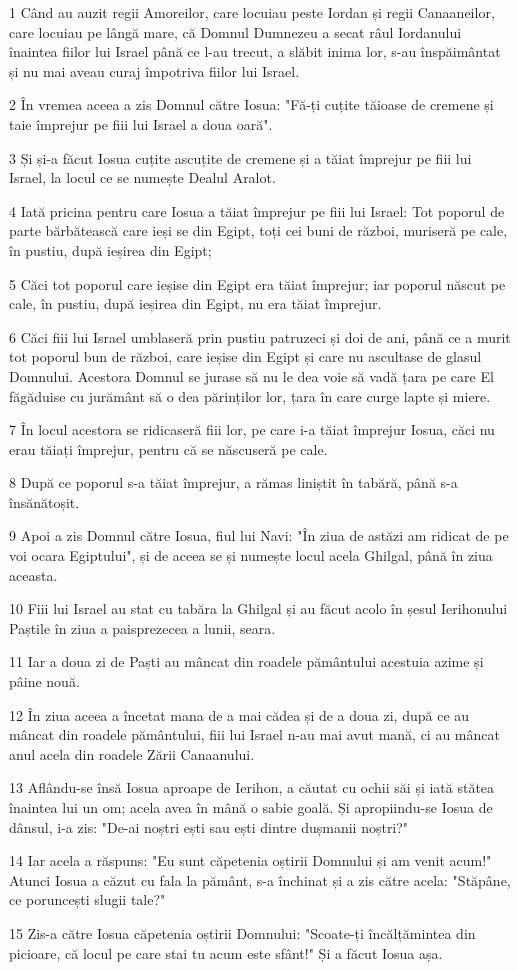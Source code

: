 \par 1 Când au auzit regii Amoreilor, care locuiau peste Iordan și regii Canaaneilor, care locuiau pe lângă mare, că Domnul Dumnezeu a secat râul Iordanului înaintea fiilor lui Israel până ce l-au trecut, a slăbit inima lor, s-au înspăimântat și nu mai aveau curaj împotriva fiilor lui Israel.
\par 2 În vremea aceea a zis Domnul către Iosua: "Fă-ți cuțite tăioase de cremene și taie împrejur pe fiii lui Israel a doua oară".
\par 3 Și și-a făcut Iosua cuțite ascuțite de cremene și a tăiat împrejur pe fiii lui Israel, la locul ce se numește Dealul Aralot.
\par 4 Iată pricina pentru care Iosua a tăiat împrejur pe fiii lui Israel: Tot poporul de parte bărbătească care ieși se din Egipt, toți cei buni de război, muriseră pe cale, în pustiu, după ieșirea din Egipt;
\par 5 Căci tot poporul care ieșise din Egipt era tăiat împrejur; iar poporul născut pe cale, în pustiu, după ieșirea din Egipt, nu era tăiat împrejur.
\par 6 Căci fiii lui Israel umblaseră prin pustiu patruzeci și doi de ani, până ce a murit tot poporul bun de război, care ieșise din Egipt și care nu ascultase de glasul Domnului. Acestora Domnul se jurase să nu le dea voie să vadă țara pe care El făgăduise cu jurământ să o dea părinților lor, țara în care curge lapte și miere.
\par 7 În locul acestora se ridicaseră fiii lor, pe care i-a tăiat împrejur Iosua, căci nu erau tăiați împrejur, pentru că se născuseră pe cale.
\par 8 După ce poporul s-a tăiat împrejur, a rămas liniștit în tabără, până s-a însănătoșit.
\par 9 Apoi a zis Domnul către Iosua, fiul lui Navi: "În ziua de astăzi am ridicat de pe voi ocara Egiptului", și de aceea se și numește locul acela Ghilgal, până în ziua aceasta.
\par 10 Fiii lui Israel au stat cu tabăra la Ghilgal și au făcut acolo în șesul Ierihonului Paștile în ziua a paisprezecea a lunii, seara.
\par 11 Iar a doua zi de Paști au mâncat din roadele pământului acestuia azime și pâine nouă.
\par 12 În ziua aceea a încetat mana de a mai cădea și de a doua zi, după ce au mâncat din roadele pământului, fiii lui Israel n-au mai avut mană, ci au mâncat anul acela din roadele Zării Canaanului.
\par 13 Aflându-se însă Iosua aproape de Ierihon, a căutat cu ochii săi și iată stătea înaintea lui un om; acela avea în mână o sabie goală. Și apropiindu-se Iosua de dânsul, i-a zis: "De-ai noștri ești sau ești dintre dușmanii noștri?"
\par 14 Iar acela a răspuns: "Eu sunt căpetenia oștirii Domnului și am venit acum!" Atunci Iosua a căzut cu fala la pământ, s-a închinat și a zis către acela: "Stăpâne, ce poruncești slugii tale?"
\par 15 Zis-a către Iosua căpetenia oștirii Domnului: "Scoate-ți încălțămintea din picioare, că locul pe care stai tu acum este sfânt!" Și a făcut Iosua așa.

